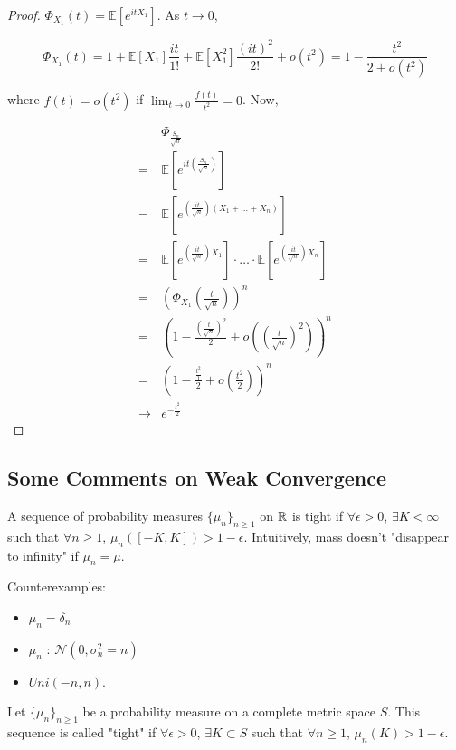 \documentclass[english, course]{Notes}
\begin{document}
\begin{proof}
$\Phi_{X_1}(t) = \mathbb{E}[e^{itX_1}]$. As $t \to 0$,

\[\Phi_{X_1}(t) = 1 + \mathbb{E}[X_1] \frac{it}{1!} + \mathbb{E}[X_1^2] \frac{(it)^2}{2!} + o(t^2) = 1 - \frac{t^2}{2 + o(t^2)}\]

where $f(t) = o(t^2)$ if $\lim_{t \to 0} \frac{f(t)}{t^2}=0$. Now,

\begin{align*}
&\Phi_{\frac{S_n}{\sqrt{n}}}\\
=& \mathbb{E}[e^{it(\frac{S_n}{\sqrt{n}})}]\\
=& \mathbb{E}[e^{(\frac{it}{\sqrt{n}})(X_1 + \dots + X_n)}]\\
=& \mathbb{E}[e^{(\frac{it}{\sqrt{n}})X_1}] \cdot \dots \cdot \mathbb{E}[e^{(\frac{it}{\sqrt{n}})X_n}]\\
=&(\Phi_{X_1}(\frac{t}{\sqrt{n}}))^n\\
=& (1 - \frac{(\frac{t}{\sqrt{n}})^2}{2} + o((\frac{t}{\sqrt{n}})^2))^n\\
=& (1 - \frac{\frac{t^2}{1}}{2} + o(\frac{t^2}{2}))^n\\
\to & e^{-\frac{t^2}{2}}
\end{align*}
\end{proof}

\subsection{Some Comments on Weak Convergence}

\begin{definition}
A sequence of probability measures $\{\mu_n\}_{n \geq 1}$ on $\mathbb{R}$ is tight if $\forall \epsilon > 0$, $\exists K < \infty$ such that $\forall n \geq 1$, $\mu_n([-K, K]) > 1 - \epsilon$. Intuitively, mass doesn't "disappear to infinity" if $\mu_n = \mu$.
\end{definition}

Counterexamples:

\begin{itemize}
	\item $\mu_n = \delta_n$
	\item $\mu_n$ : $\mathcal{N}(0, \sigma_n^2 = n)$
	\item $Uni(-n, n)$.
\end{itemize}

\begin{definition}
Let $\{\mu_n\}_{n \geq 1}$ be a probability measure on a complete metric space $S$. This sequence is called "tight" if $\forall \epsilon > 0$, $\exists K \subset S$ such that $\forall n \geq 1$, $\mu_n(K) > 1 - \epsilon$.
\end{definition}
\end{document}
